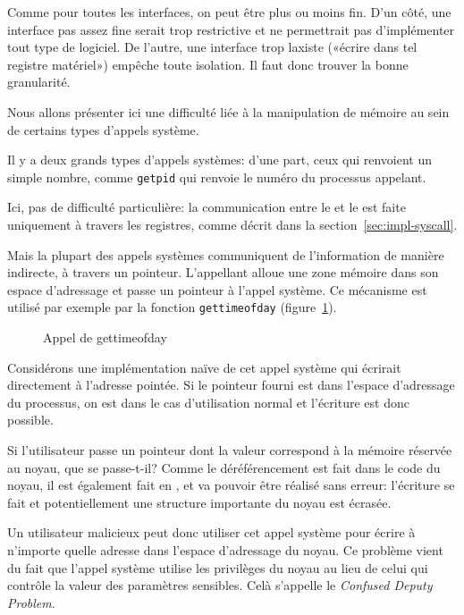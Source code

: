 Comme pour toutes les interfaces, on peut être plus ou moins fin. D'un
côté, une interface pas assez fine serait trop restrictive et ne permettrait pas
d'implémenter tout type de logiciel. De l'autre, une interface trop laxiste
(«écrire dans tel registre matériel») empêche toute isolation. Il faut
donc trouver la bonne granularité.

Nous allons présenter ici une difficulté liée à la manipulation de mémoire au
sein de certains types d'appels système.

Il y a deux grands types d'appels systèmes: d'une part, ceux qui renvoient un
simple nombre, comme \texttt{getpid} qui renvoie le numéro du processus
appelant.


Ici, pas de difficulté particulière: la communication entre le  et le
 est faite uniquement à travers les registres, comme décrit dans la
section~\ref{sec:impl-syscall}.

Mais la plupart des appels systèmes communiquent de l'information de manière
indirecte, à travers un pointeur. L'appellant alloue une zone mémoire dans son
espace d'adressage et passe un pointeur à l'appel système. Ce mécanisme est
utilisé par exemple par la fonction \texttt{gettimeofday}
(figure~\ref{fig:appel-gettimeofday}).

\begin{figure}[h]
\caption{Appel de gettimeofday}
\label{fig:appel-gettimeofday}
\end{figure}

Considérons une implémentation naïve de cet appel système qui écrirait
directement à l'adresse pointée. Si le pointeur fourni est dans l'espace
d'adressage du processus, on est dans le cas d'utilisation normal et l'écriture
est donc possible.

Si l'utilisateur passe un pointeur dont la valeur correspond à la mémoire
réservée au noyau, que se passe-t-il? Comme le déréférencement est fait dans le
code du noyau, il est également fait en , et va pouvoir être réalisé
sans erreur: l'écriture se fait et potentiellement une structure importante du
noyau est écrasée.

Un utilisateur malicieux peut donc utiliser cet appel système pour écrire à
n'importe quelle adresse dans l'espace d'adressage du noyau. Ce problème vient
du fait que l'appel système utilise les privilèges du noyau au lieu de celui qui
contrôle la valeur des paramètres sensibles. Celà s'appelle le \emph{Confused
Deputy Problem}\cite{hardy88confused}.

